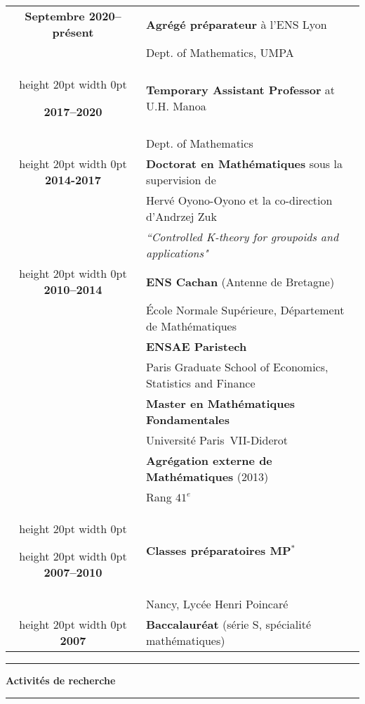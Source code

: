 \documentclass[a4paper,11pt]{article}
\newcommand\espace{\vrule height 20pt width 0pt}
\newcommand{\titre}[1]{%
	\begin{center}
	\bigskip
	\rule{\textwidth}{1pt}
	\par\vspace{0.1cm}
        \textbf{\large #1}
	\par\rule{\textwidth}{1pt}
	\end{center}
	\bigskip
	}
\begin{document}
\begin{tabular}{cp{}}

\textbf{Septembre 2020--présent} &  \textbf{Agr\'eg\'e pr\'eparateur} à l'ENS Lyon \\
						& Dept. of Mathematics, UMPA\\

\espace

\textbf{2017--2020} &  \textbf{Temporary Assistant Professor} at U.H. Manoa  \\
						& Dept. of Mathematics\\
\espace
\textbf{2014-2017} &  \textbf{Doctorat en Math\'ematiques} sous la supervision de \\
						& Hervé Oyono-Oyono et la co-direction d'Andrzej Zuk \\	
						& \textit{``Controlled K-theory for groupoids and applications"} \\
\espace
\textbf{2010--2014} &  \textbf{ENS Cachan} (Antenne de Bretagne) \\
				    & 	\'Ecole Normale Supérieure, D\'epartement de Math\'ematiques \\
                              & \textbf{ENSAE Paristech}\\
				&	Paris Graduate School of Economics, Statistics and Finance\\
                                   & \textbf{Master en Math\'ematiques Fondamentales}\\  & Universit\'e Paris~VII-Diderot \\
                                   & \textbf{Agrégation externe de Mathématiques} (2013) \\ 
							& Rang $41^e$ \\
\espace

\espace
\textbf{2007--2010} &\textbf{Classes préparatoires MP$^*$ } \\
					& Nancy, Lycée Henri Poincaré\\

\espace
\textbf{2007} & \textbf{Baccalauréat} (série S, sp\'ecialit\'e math\'ematiques) 
 \\

\end{tabular}

\newpage
\titre{Activit\'es de recherche}
\end{document}
